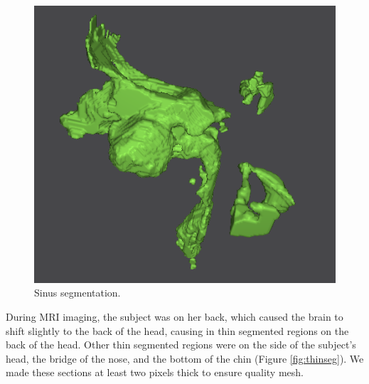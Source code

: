 \begin{figure}[H]
\begin{center}
\includegraphics[width=.49\textwidth]{Figures/sinus_iso}
\caption{Sinus segmentation.}
\label{fig:sinus}
\end{center}
\end{figure}

During MRI imaging, the subject was on her back, which caused the brain to shift slightly to the back of the head, causing in thin segmented regions on the back of the head. Other thin segmented regions were on the side of the subject's head, the bridge of the nose, and the bottom of the chin (Figure \ref{fig:thinseg}). We made these sections at least two pixels thick to ensure quality mesh.


